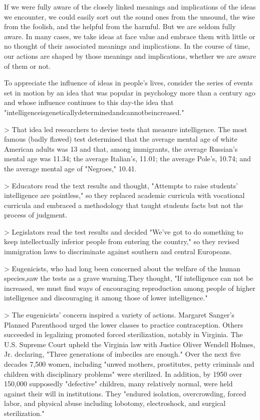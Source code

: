 \documentclass{book}
\begin{document}
If we were fully aware of the closely linked meanings and implications of the ideas we encounter, we could easily sort out the sound ones from the unsound, the wise from the foolish, and the helpful from the harmful. But we are seldom fully aware. In many cases, we take ideas at face value and embrace them with little or no thought of their associated meanings and implications. In the course of time, our actions are shaped by those meanings and implications, whether we are aware of them or not.

To appreciate the influence of ideas in people’s lives, consider the series of events set in motion by an idea that was popular in psychology more than a century ago and whose influence continues to this day-the idea that "intelligenceisgeneticallydeterminedandcannotbeincreased."

> That idea led researchers to devise tests that measure intelligence. The most famous (badly flawed) test determined that the average mental age of white American adults was 13 and that, among immigrants, the average Russian’s mental age was 11.34; the average Italian’s, 11.01; the average Pole’s, 10.74; and the average mental age of "Negroes," 10.41.

> Educators read the text results and thought, "Attempts to raise students’ intelligence are pointless," so they replaced academic curricula with vocational curricula and embraced a methodology that taught students facts but not the process of judgment.

> Legislators read the test results and decided "We’ve got to do something to keep intellectually inferior people from entering the country," so they revised immigration laws to discriminate against southern and central Europeans.

> Eugenicists, who had long been concerned about the welfare of the human species,saw the tests as a grave warning.They thought, "If intelligence can not be increased, we must find ways of encouraging reproduction among people of higher intelligence and discouraging it among those of lower intelligence."

> The eugenicists’ concern inspired a variety of actions. Margaret Sanger’s Planned Parenthood urged the lower classes to practice contraception. Others succeeded in legalizing promoted forced sterilization, notably in Virginia. The U.S. Supreme Court upheld the Virginia law with Justice Oliver Wendell Holmes, Jr. declaring, "Three generations of imbeciles are enough." Over the next five decades 7,500 women, including "unwed mothers, prostitutes, petty criminals and children with disciplinary problems" were sterilized. In addition, by 1950 over 150,000 supposedly "defective" children, many relatively normal, were held against their will in institutions. They "endured isolation, overcrowding, forced labor, and physical abuse including lobotomy, electroshock, and surgical sterilization."
\end{document}
